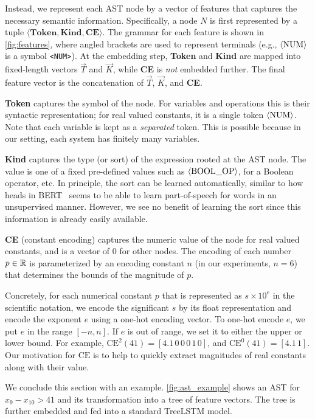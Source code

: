 Instead, we represent each AST node by a vector of features that captures the necessary semantic information. Specifically, a node $N$ is first represented by a tuple $\langle\textbf{Token}, \textbf{Kind}, \textbf{CE} \rangle$. The grammar for each feature is shown in \cref{fig:features}, where angled brackets are used to represent terminals (e.g., $\langle \text{\text{NUM}} \rangle$ is a symbol \texttt{<NUM>}). At the embedding step, \textbf{Token} and \textbf{Kind} are mapped into fixed-length vectors $\Vec{T}$ and $\Vec{K}$, while \textbf{CE} is \emph{not} embedded further. The final feature vector is the concatenation of $\Vec{T}$, $\Vec{K}$, and \textbf{CE}.

\textbf{Token} captures the symbol of the node. For variables and operations this is their syntactic representation; for real valued constants, it is a single token $\langle \text{NUM} \rangle$. Note that each variable is kept as a \emph{separated} token. This is possible because in our setting, each system has finitely many variables.

\textbf{Kind} captures the type (or sort) of the expression rooted at the AST node. The value is one of a fixed pre-defined values such as $\langle \text{\text{BOOL\_OP}} \rangle$, for a Boolean operator, etc. In principle, the sort can be learned automatically, similar to how heads in BERT~\cite{bert} seems to be able to learn part-of-speech for words in an unsupervised manner. However, we see no benefit of learning the sort since this information is already easily available.

\textbf{CE} (constant encoding) captures the numeric value of the node for real valued constants, and is a vector of $0$ for other nodes. The encoding of each number $p \in \mathbb{R}$ is parameterized by an encoding constant $n$ (in our experiments, $n = 6$) that determines the bounds of the magnitude of $p$.

Concretely, for each numerical constant $p$ that is represented as $s \times 10^{e}$ in the scientific notation, we encode the significant $s$ by its float representation and encode the exponent $e$ using a one-hot encoding vector. To one-hot encode $e$, we put $e$ in the range $[-n, n]$. If $e$ is out of range, we set it to either the upper or lower bound. For example, $\text{CE}^{2}(41) = [4.1 \, 0\, 0\, 0\, 1\, 0]$, and $\text{CE}^0(41) = [4.1 \, 1 ]$.  Our  motivation for $\text{CE}$ is to help \dpy to quickly extract  magnitudes of real constants along with their value.

We conclude this section with an example. \cref{fig:ast_example} shows an AST for $x_9 - x_{10} > 41$ and its transformation into a tree of feature vectors. The tree is further embedded and fed into a standard TreeLSTM model.

